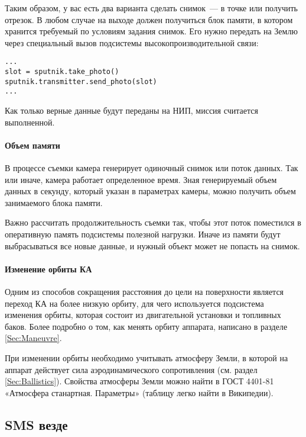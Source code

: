 \documentclass[12pt,a4paper]{article}
\begin{document}
Таким образом, у вас есть два варианта сделать снимок~--- в точке или получить отрезок. В
любом случае на выходе должен получиться блок памяти, в котором хранится требуемый по
условиям задания снимок. Его нужно передать на Землю через специальный вызов подсистемы
высокопроизводительной связи:

\begin{verbatim}
...
slot = sputnik.take_photo()
sputnik.transmitter.send_photo(slot)
...
\end{verbatim}

Как только верные данные будут переданы на НИП, миссия считается выполненной.

\paragraph{Объем памяти}

В процессе съемки камера генерирует одиночный снимок или поток данных. Так или иначе,
камера работает определенное время. Зная генерируемый объем данных в секунду, который
указан в параметрах камеры, можно получить объем занимаемого блока памяти.

Важно рассчитать продолжительность съемки так, чтобы этот поток поместился в оперативную
память подсистемы полезной нагрузки. Иначе из памяти будут выбрасываться все новые данные,
и нужный объект может не попасть на снимок.

\paragraph{Изменение орбиты КА}

Одним из способов сокращения расстояния до цели на поверхности является переход КА на
более низкую орбиту, для чего используется подсистема изменения орбиты, которая состоит из
двигательной установки и топливных баков. Более подробно о том, как менять орбиту
аппарата, написано в разделе \ref{Sec:Maneuvre}.

При изменении орбиты необходимо учитывать атмосферу Земли, в которой на аппарат действует
сила аэродинамического сопротивления (см. раздел \ref{Sec:Ballistics}). Свойства атмосферы
Земли можно найти в ГОСТ 4401-81 «Атмосфера станартная. Параметры» (таблицу легко найти в
Википедии).

\clearpage
\subsection{SMS везде}
\end{document}
